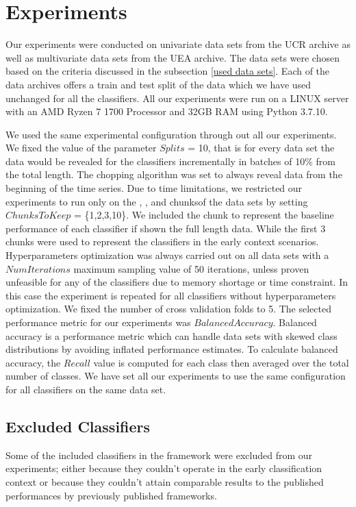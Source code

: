 
\section{Experiments}
\label{SectionExperiment}
Our experiments were conducted on univariate data sets from the UCR archive as well as multivariate data sets from the UEA archive.
The data sets were chosen based on the criteria discussed in the subsection \ref{used data sets}.
Each of the data archives offers a train and test split of the data which we have used unchanged for all the classifiers.
All our experiments were run on a LINUX server with an AMD Ryzen 7 1700 Processor and 32GB RAM using Python 3.7.10.

We used the same experimental configuration through out all our experiments.
We fixed the value of the parameter $Splits$ = 10, that is for every data set the data would be revealed for the classifiers incrementally in batches of 10\% from the total length.
The chopping algorithm was set to always reveal data from the beginning of the time series.
Due to time limitations, we restricted our experiments to run only on the , ,  and  chunksof the data sets by setting $ChunksToKeep$ = \{1,2,3,10\}.
We included the  chunk to represent the baseline performance of each classifier if shown the full length data.
While the first 3 chunks were used to represent the classifiers in the early context scenarios.
Hyperparameters optimization was always carried out on all data sets with a $NumIterations$ maximum sampling value of 50 iterations, unless proven unfeasible for any of the classifiers due to memory shortage or time constraint.
In this case the experiment is repeated for all classifiers without hyperparameters optimization. We fixed the number of cross validation folds to 5.
The selected performance metric for our experiments was $Balanced Accuracy$.
Balanced accuracy is a performance metric which can handle data sets with skewed class distributions by avoiding inflated performance estimates.
To calculate balanced accuracy, the $Recall$ value is computed for each class then averaged over the total number of classes.
We have set all our experiments to use the same configuration for all classifiers on the same data set.


\subsection{Excluded Classifiers}
\label{SubsectionExcludedClassifiers}
Some of the included classifiers in the framework were excluded from our experiments; either because they couldn't operate in the early classification context
or because they couldn't attain comparable results to the published performances by previously published frameworks.

